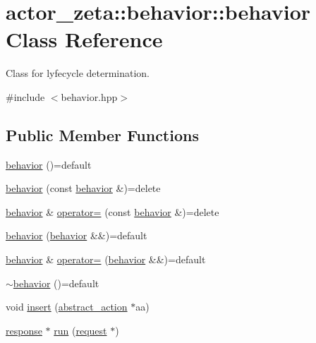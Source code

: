 \hypertarget{classactor__zeta_1_1behavior_1_1behavior}{}\section{actor\+\_\+zeta\+:\+:behavior\+:\+:behavior Class Reference}
\label{classactor__zeta_1_1behavior_1_1behavior}


Class for lyfecycle determination.  




{\ttfamily \#include $<$behavior.\+hpp$>$}

\subsection*{Public Member Functions}
\begin{DoxyCompactItemize}
\item 
\hyperlink{classactor__zeta_1_1behavior_1_1behavior_a45bc401dcc164040a9238208cde6dffb}{behavior} ()=default
\item 
\hyperlink{classactor__zeta_1_1behavior_1_1behavior_a6344c481184cac6604a0e12a456030d9}{behavior} (const \hyperlink{classactor__zeta_1_1behavior_1_1behavior}{behavior} \&)=delete
\item 
\hyperlink{classactor__zeta_1_1behavior_1_1behavior}{behavior} \& \hyperlink{classactor__zeta_1_1behavior_1_1behavior_aee101abd51ff89624d10d212819e1536}{operator=} (const \hyperlink{classactor__zeta_1_1behavior_1_1behavior}{behavior} \&)=delete
\item 
\hyperlink{classactor__zeta_1_1behavior_1_1behavior_a14789bb3caa8c52b357cdc2d3993542a}{behavior} (\hyperlink{classactor__zeta_1_1behavior_1_1behavior}{behavior} \&\&)=default
\item 
\hyperlink{classactor__zeta_1_1behavior_1_1behavior}{behavior} \& \hyperlink{classactor__zeta_1_1behavior_1_1behavior_a6c2c0df75e9e3d506a8d1bb08624189e}{operator=} (\hyperlink{classactor__zeta_1_1behavior_1_1behavior}{behavior} \&\&)=default
\item 
\hyperlink{classactor__zeta_1_1behavior_1_1behavior_a5789e47a451753e232ba8f30c715a2ac}{$\sim$behavior} ()=default
\item 
void \hyperlink{classactor__zeta_1_1behavior_1_1behavior_a35eac06fcdfd444581e9e7afac5163c5}{insert} (\hyperlink{classactor__zeta_1_1behavior_1_1abstract__action}{abstract\+\_\+action} $\ast$aa)
\item 
\hyperlink{classactor__zeta_1_1behavior_1_1response}{response} $\ast$ \hyperlink{classactor__zeta_1_1behavior_1_1behavior_ae1d002a9eaf9367150002d73d47d680a}{run} (\hyperlink{classactor__zeta_1_1behavior_1_1request}{request} $\ast$)
\end{DoxyCompactItemize}


